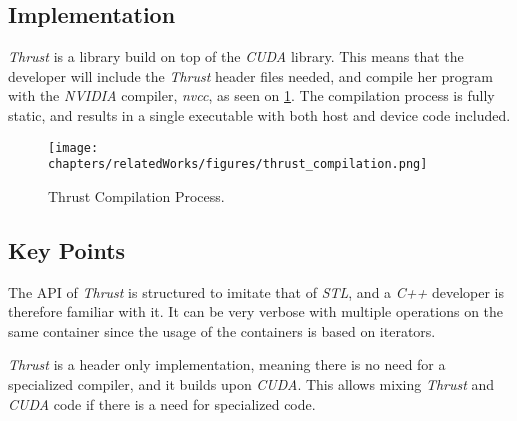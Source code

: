 \subsection{Implementation}
\textit{Thrust} is a library build on top of the \textit{CUDA} library. This means that the developer will include the \textit{Thrust} header files needed, and compile her program with the \textit{NVIDIA} compiler, \textit{nvcc}, as seen on \ref{fig:thrustCompilation}. The compilation process is fully static, and results in a single executable with both host and device code included.
\begin{figure}[H]
\center
\texttt{[image: chapters/relatedWorks/figures/thrust\_compilation.png]}
\caption{Thrust Compilation Process.}
\label{fig:thrustCompilation}
\end{figure}

\subsection{Key Points}
The API of \textit{Thrust} is structured to imitate that of \textit{STL}, and a \textit{C++} developer is therefore familiar with it. It can be very verbose with multiple operations on the same container since the usage of the containers is based on iterators.

\textit{Thrust} is a header only implementation, meaning there is no need for a specialized compiler, and it builds upon \textit{CUDA}. This allows mixing \textit{Thrust} and \textit{CUDA} code if there is a need for specialized code.